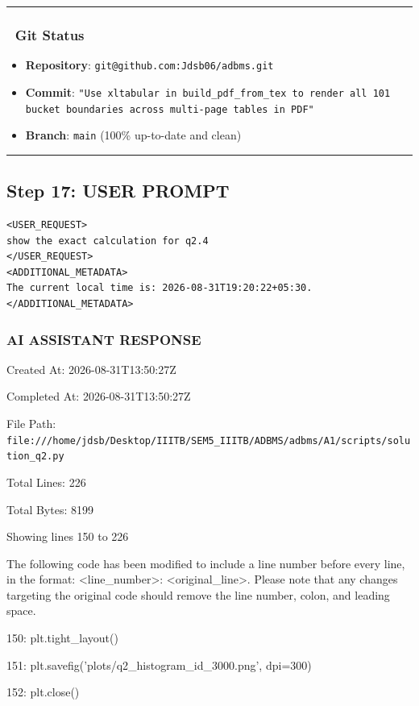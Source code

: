 \documentclass[11pt,a4paper]{article}
\begin{document}
{{{\hrule


\subsubsection{🐙 Git Status}
\begin{itemize}
\item \textbf{Repository}: \texttt{git@github.com:Jdsb06/adbms.git}
\item \textbf{Commit}: \texttt{"Use xltabular in build\_pdf\_from\_tex to render all 101 bucket boundaries across multi-page tables in PDF"}
\item \textbf{Branch}: \texttt{main} (100\% up-to-date and clean)
\end{itemize}

\hrule

\subsection{Step 17: USER PROMPT}

\begin{lstlisting}[language=text]
<USER_REQUEST>
show the exact calculation for q2.4 
</USER_REQUEST>
<ADDITIONAL_METADATA>
The current local time is: 2026-08-31T19:20:22+05:30.
</ADDITIONAL_METADATA>
\end{lstlisting}


\subsubsection{AI ASSISTANT RESPONSE}

Created At: 2026-08-31T13:50:27Z

Completed At: 2026-08-31T13:50:27Z

File Path: \texttt{file:///home/jdsb/Desktop/IIITB/SEM5\_IIITB/ADBMS/adbms/A1/scripts/solution\_q2.py}

Total Lines: 226

Total Bytes: 8199

Showing lines 150 to 226

The following code has been modified to include a line number before every line, in the format: <line\_number>: <original\_line>. Please note that any changes targeting the original code should remove the line number, colon, and leading space.

150:     plt.tight\_layout()

151:     plt.savefig('plots/q2\_histogram\_id\_3000.png', dpi=300)

152:     plt.close()

}}}
\end{document}
